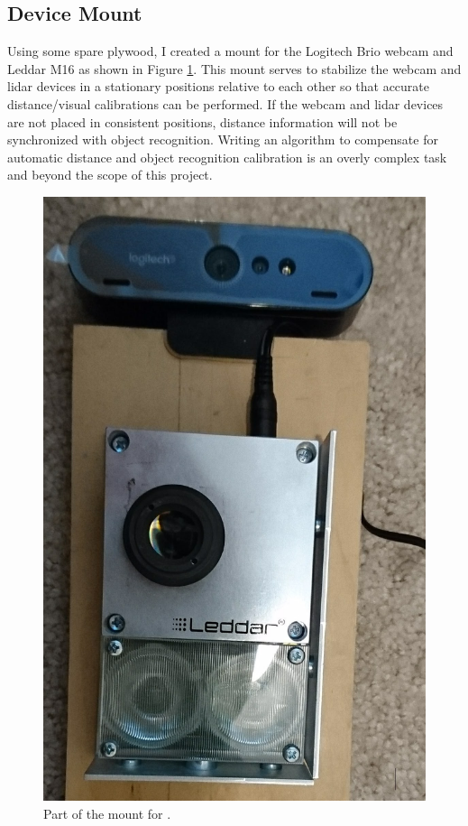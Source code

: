 \documentclass[onecolumn, draftclsnofoot,10pt, compsoc]{IEEEtran}
\makeatletter
\newcommand\captionof[1]{\def\@captype{#1}\caption}
\makeatother
\begin{document}
\begin{singlespace}
	\subsection{Device Mount}
		Using some spare plywood, I created a mount for the Logitech Brio webcam and Leddar M16 as shown in Figure \ref{mount1}.
		This mount serves to stabilize the webcam and lidar devices in a stationary positions relative to each other so that accurate distance/visual calibrations can be performed.
		If the webcam and lidar devices are not placed in consistent positions, distance information will not be synchronized with object recognition.
		Writing an algorithm to compensate for automatic distance and object recognition calibration is an overly complex task and beyond the scope of this project.

		\begin{figure}[H]
			\includegraphics[scale=0.2]{mount1.PNG}
			\captionof{figure}{Part of the mount for .}
			\label{mount1}
		\end{figure}



\end{singlespace}
\end{document}
